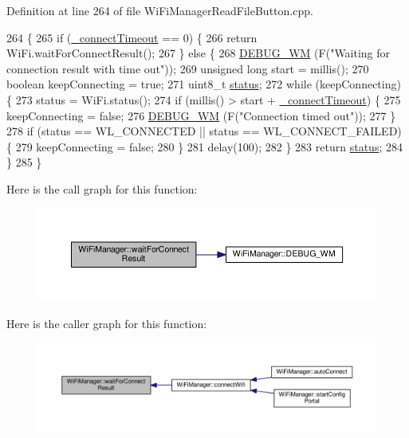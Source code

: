Definition at line 264 of file Wi\+Fi\+Manager\+Read\+File\+Button.\+cpp.


\begin{DoxyCode}
264                                           \{
265   \textcolor{keywordflow}{if} (\hyperlink{class_wi_fi_manager_a6c03ca5d418b4d46e9a6d751a902184c}{\_connectTimeout} == 0) \{
266     \textcolor{keywordflow}{return} WiFi.waitForConnectResult();
267   \} \textcolor{keywordflow}{else} \{
268     \hyperlink{class_wi_fi_manager_ae5f595c670ccbcf9a191baf50f5c7c26}{DEBUG\_WM} (F(\textcolor{stringliteral}{"Waiting for connection result with time out"}));
269     \textcolor{keywordtype}{unsigned} \textcolor{keywordtype}{long} start = millis();
270     \textcolor{keywordtype}{boolean} keepConnecting = \textcolor{keyword}{true};
271     uint8\_t \hyperlink{class_wi_fi_manager_acceea0054a30c18809b34151d4e9eb0b}{status};
272     \textcolor{keywordflow}{while} (keepConnecting) \{
273       status = WiFi.status();
274       \textcolor{keywordflow}{if} (millis() > start + \hyperlink{class_wi_fi_manager_a6c03ca5d418b4d46e9a6d751a902184c}{\_connectTimeout}) \{
275         keepConnecting = \textcolor{keyword}{false};
276         \hyperlink{class_wi_fi_manager_ae5f595c670ccbcf9a191baf50f5c7c26}{DEBUG\_WM} (F(\textcolor{stringliteral}{"Connection timed out"}));
277       \}
278       \textcolor{keywordflow}{if} (status == WL\_CONNECTED || status == WL\_CONNECT\_FAILED) \{
279         keepConnecting = \textcolor{keyword}{false};
280       \}
281       delay(100);
282     \}
283     \textcolor{keywordflow}{return} \hyperlink{class_wi_fi_manager_acceea0054a30c18809b34151d4e9eb0b}{status};
284   \}
285 \}
\end{DoxyCode}
Here is the call graph for this function\+:
\nopagebreak
\begin{figure}[H]
\begin{center}
\leavevmode
\includegraphics[width=350pt]{d4/dc8/class_wi_fi_manager_a89a3f33997aa662ad223d6c150c1eede_cgraph}
\end{center}
\end{figure}
Here is the caller graph for this function\+:
\nopagebreak
\begin{figure}[H]
\begin{center}
\leavevmode
\includegraphics[width=350pt]{d4/dc8/class_wi_fi_manager_a89a3f33997aa662ad223d6c150c1eede_icgraph}
\end{center}
\end{figure}


